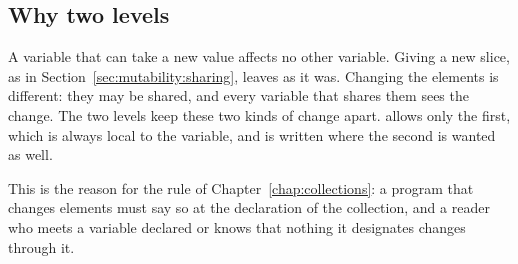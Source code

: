 \subsection{Why two levels}

A variable that can take a new value affects no other variable. Giving
 a new slice, as in Section~\ref{sec:mutability:sharing}, leaves
 as it was. Changing the elements is different: they may be shared,
and every variable that shares them sees the change. The two levels keep these
two kinds of change apart.  allows only the first, which is
always local to the variable, and  is written where the second
is wanted as well.

This is the reason for the rule of Chapter~\ref{chap:collections}: a program
that changes elements must say so at the declaration of the collection, and a
reader who meets a variable declared  or  knows that
nothing it designates changes through it.
